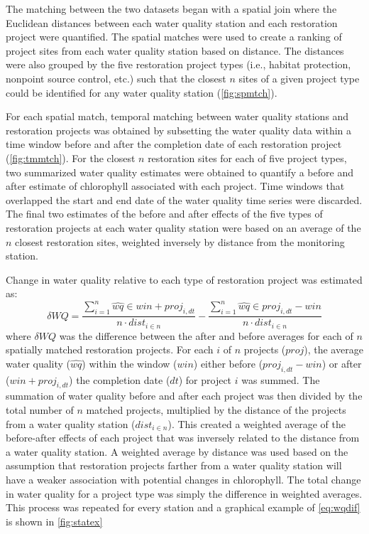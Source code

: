 \documentclass[]{article}
\begin{document}
The matching between the two datasets began with a spatial join where
the Euclidean distances between each water quality station and each
restoration project were quantified. The spatial matches were used to
create a ranking of project sites from each water quality station based
on distance. The distances were also grouped by the five restoration
project types (i.e., habitat protection, nonpoint source control, etc.)
such that the closest \(n\) sites of a given project type could be
identified for any water quality station (\cref{fig:spmtch}).

For each spatial match, temporal matching between water quality stations
and restoration projects was obtained by subsetting the water quality
data within a time window before and after the completion date of each
restoration project (\cref{fig:tmmtch}). For the closest \(n\)
restoration sites for each of five project types, two summarized water
quality estimates were obtained to quantify a before and after estimate
of chlorophyll associated with each project. Time windows that
overlapped the start and end date of the water quality time series were
discarded. The final two estimates of the before and after effects of
the five types of restoration projects at each water quality station
were based on an average of the \(n\) closest restoration sites,
weighted inversely by distance from the monitoring station.

Change in water quality relative to each type of restoration project was
estimated as: \begin{equation}
\delta WQ = \frac{\sum_{i = 1}^{n} \hat{wq} \in win + proj_{i, dt}}{n \cdot dist_{i \in n}} - \frac{\sum_{i = 1}^{n} \hat{wq} \in proj_{i, dt} - win}{n \cdot dist_{i \in n}}
\label{eq:wqdif}
\end{equation} where \(\delta WQ\) was the difference between the after
and before averages for each of \(n\) spatially matched restoration
projects. For each \(i\) of \(n\) projects (\(proj\)), the average water
quality (\(\hat{wq}\)) within the window (\(win\)) either before
(\(proj_{i, dt} - win\)) or after (\(win + proj_{i, dt}\)) the
completion date (\(dt\)) for project \(i\) was summed. The summation of
water quality before and after each project was then divided by the
total number of \(n\) matched projects, multiplied by the distance of
the projects from a water quality station (\(dist_{i \in n}\)). This
created a weighted average of the before-after effects of each project
that was inversely related to the distance from a water quality station.
A weighted average by distance was used based on the assumption that
restoration projects farther from a water quality station will have a
weaker association with potential changes in chlorophyll. The total
change in water quality for a project type was simply the difference in
weighted averages. This process was repeated for every station and a
graphical example of \cref{eq:wqdif} is shown in \cref{fig:statex}
\end{document}
